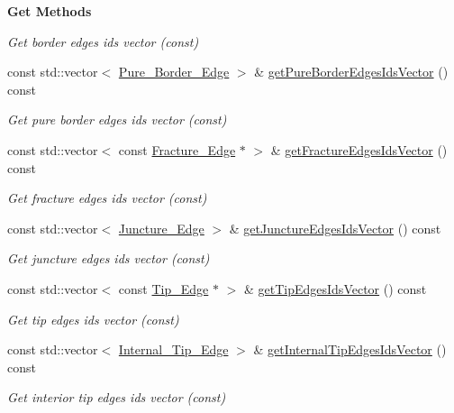 \begin{Indent}{\bf Get Methods}
\begin{DoxyCompactItemize}
\begin{DoxyCompactList}\small\item\em Get border edges ids vector (const) \end{DoxyCompactList}\item 
const std\+::vector$<$ \hyperlink{classFVCode3D_1_1Rigid__Mesh_1_1Pure__Border__Edge}{Pure\+\_\+\+Border\+\_\+\+Edge} $>$ \& \hyperlink{classFVCode3D_1_1Rigid__Mesh_ad18503d8be34525dd4ccbd7d6bc972c0}{get\+Pure\+Border\+Edges\+Ids\+Vector} () const 
\begin{DoxyCompactList}\small\item\em Get pure border edges ids vector (const) \end{DoxyCompactList}\item 
const std\+::vector$<$ const \hyperlink{classFVCode3D_1_1Rigid__Mesh_1_1Fracture__Edge}{Fracture\+\_\+\+Edge} $\ast$ $>$ \& \hyperlink{classFVCode3D_1_1Rigid__Mesh_a2f9f5bc2b00d2933d659e1b8cd5970fc}{get\+Fracture\+Edges\+Ids\+Vector} () const 
\begin{DoxyCompactList}\small\item\em Get fracture edges ids vector (const) \end{DoxyCompactList}\item 
const std\+::vector$<$ \hyperlink{classFVCode3D_1_1Rigid__Mesh_1_1Juncture__Edge}{Juncture\+\_\+\+Edge} $>$ \& \hyperlink{classFVCode3D_1_1Rigid__Mesh_ab5e13da1e797fbbb301b15272a96c27a}{get\+Juncture\+Edges\+Ids\+Vector} () const 
\begin{DoxyCompactList}\small\item\em Get juncture edges ids vector (const) \end{DoxyCompactList}\item 
const std\+::vector$<$ const \hyperlink{classFVCode3D_1_1Rigid__Mesh_1_1Tip__Edge}{Tip\+\_\+\+Edge} $\ast$ $>$ \& \hyperlink{classFVCode3D_1_1Rigid__Mesh_af886299593ba5c9f9a33ee9d8ff4d4a6}{get\+Tip\+Edges\+Ids\+Vector} () const 
\begin{DoxyCompactList}\small\item\em Get tip edges ids vector (const) \end{DoxyCompactList}\item 
const std\+::vector$<$ \hyperlink{classFVCode3D_1_1Rigid__Mesh_1_1Internal__Tip__Edge}{Internal\+\_\+\+Tip\+\_\+\+Edge} $>$ \& \hyperlink{classFVCode3D_1_1Rigid__Mesh_a167962718f17ff75f349a1a072d1627b}{get\+Internal\+Tip\+Edges\+Ids\+Vector} () const 
\begin{DoxyCompactList}\small\item\em Get interior tip edges ids vector (const) \end{DoxyCompactList}\item 

\end{DoxyCompactItemize}
\end{Indent}
